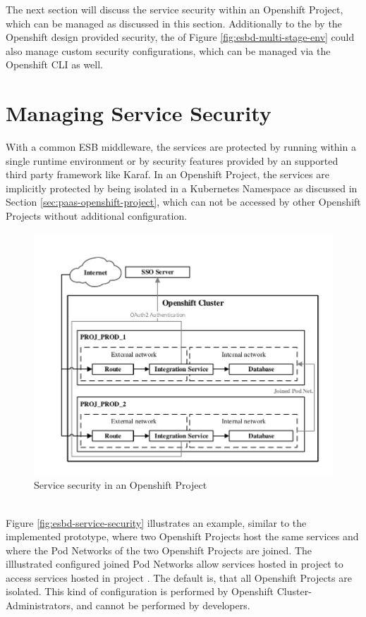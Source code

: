 The next section will discuss the service security within an Openshift Project, which can be managed as discussed in this section. Additionally to the by the Openshift design provided security, the  of Figure \vref{fig:esbd-multi-stage-env} could also manage custom security configurations, which can be managed via the Openshift CLI as well. 

\section{Managing Service Security}
\label{sec:esbd-service-security}
With a common ESB middleware, the services are protected by running within a single runtime environment or by security features provided by an supported third party framework like Karaf. In an Openshift Project, the services are implicitly protected by being isolated in a Kubernetes Namespace as discussed in Section \vref{sec:paas-openshift-project}, which can not be accessed by other Openshift Projects without additional configuration.
\newpage

\begin{figure}[htbp]
	\centering
	\includegraphics[scale=1]{images/esbd-service-security.pdf}
	\caption{Service security in an Openshift Project}
	\label{fig:esbd-service-security}
\end{figure}
\ \\
Figure \vref{fig:esbd-service-security} illustrates an example, similar to the implemented prototype, where two Openshift Projects host the same services and where the Pod Networks of the two Openshift Projects are joined. The illlustrated configured joined Pod Networks allow services hosted in project  to access services hosted in project . The default is, that all Openshift Projects are isolated. This kind of configuration is performed by Openshift Cluster-Administrators, and cannot be performed by developers. \\

